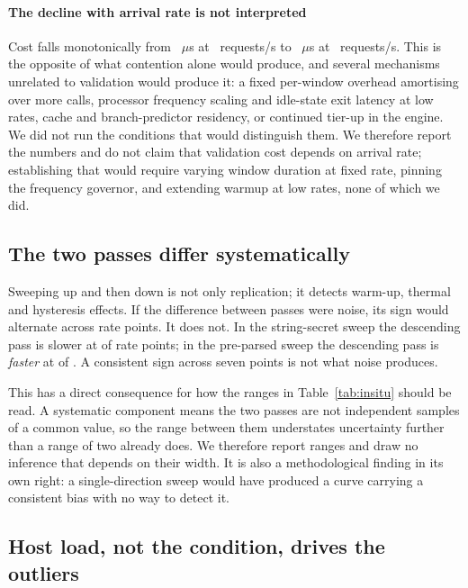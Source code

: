 \documentclass[preprint,12pt,authoryear]{elsarticle}
\begin{document}
\paragraph{The decline with arrival rate is not interpreted} Cost falls
monotonically from \InsituStringAscA~$\mu$s at \InsituRateA~requests/s to
\InsituStringAscG~$\mu$s at \InsituRateG~requests/s. This is the opposite of what
contention alone would produce, and several mechanisms unrelated to validation
would produce it: a fixed per-window overhead amortising over more calls,
processor frequency scaling and idle-state exit latency at low rates, cache and
branch-predictor residency, or continued tier-up in the engine. We did not run
the conditions that would distinguish them. We therefore report the numbers and
do not claim that validation cost depends on arrival rate; establishing that
would require varying window duration at fixed rate, pinning the frequency
governor, and extending warmup at low rates, none of which we did.

\subsection{The two passes differ systematically}\label{sec:drift}

Sweeping up and then down is not only replication; it detects warm-up, thermal
and hysteresis effects. If the difference between passes were noise, its sign
would alternate across rate points. It does not. In the string-secret sweep the
descending pass is slower at \InsituStringSameSign{} of \InsituStringPoints{}
rate points; in the pre-parsed sweep the descending pass is \emph{faster} at
\InsituPreparsedSameSign{} of \InsituPreparsedPoints. A consistent sign across
seven points is not what noise produces.

This has a direct consequence for how the ranges in Table~\ref{tab:insitu} should
be read. A systematic component means the two passes are not independent samples
of a common value, so the range between them understates uncertainty further than
a range of two already does. We therefore report ranges and draw no inference that
depends on their width. It is also a methodological finding in its own right: a
single-direction sweep would have produced a curve carrying a consistent bias with
no way to detect it.

\subsection{Host load, not the condition, drives the outliers}\label{sec:load}
\end{document}
